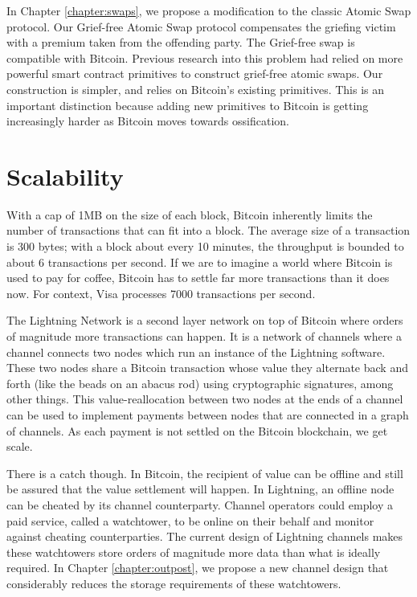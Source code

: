 In Chapter \ref{chapter:swaps}, we propose a modification to the classic Atomic Swap protocol. Our Grief-free Atomic Swap protocol compensates the griefing victim with a premium taken from the offending party. The Grief-free swap is compatible with Bitcoin. Previous research into this problem had relied on more powerful smart contract primitives to construct grief-free atomic swaps. Our construction is simpler, and relies on Bitcoin's existing primitives. This is an important distinction because adding new primitives to Bitcoin is getting increasingly harder as Bitcoin moves towards ossification. 

\section{Scalability}
With a cap of 1MB on the size of each block, Bitcoin inherently limits the number of transactions that can fit into a block. The average size of a transaction is 300 bytes; with a block about every 10 minutes, the throughput is bounded to about 6 transactions per second. If we are to imagine a world where Bitcoin is used to pay for coffee, Bitcoin has to settle far more transactions than it does now. For context, Visa processes 7000 transactions per second. 

The Lightning Network is a second layer network on top of Bitcoin where orders of magnitude more transactions can happen. It is a network of channels where a channel connects two nodes which run an instance of the Lightning software. These two nodes share a Bitcoin transaction whose value they alternate back and forth (like the beads on an abacus rod) using cryptographic signatures, among other things. This value-reallocation between two nodes at the ends of a channel can be used to implement payments between nodes that are connected in a graph of channels. As each payment is not settled on the Bitcoin blockchain, we get scale. 

There is a catch though. In Bitcoin, the recipient of value can be offline and still be assured that the value settlement will happen. In Lightning, an offline node can be cheated by its channel counterparty. Channel operators could employ a paid service, called a watchtower, to be online on their behalf and monitor against cheating counterparties. The current design of Lightning channels makes these watchtowers store orders of magnitude more data than what is ideally required. In Chapter \ref{chapter:outpost}, we propose a new channel design that considerably reduces the storage requirements of these watchtowers. 


